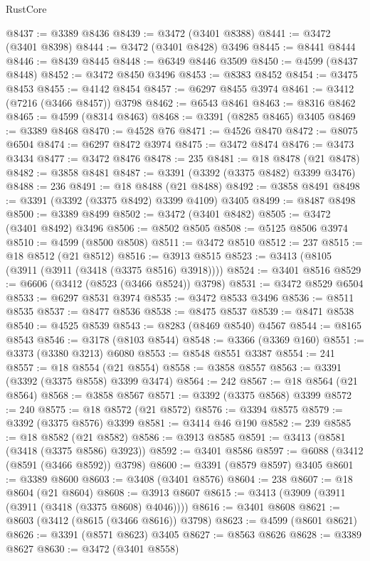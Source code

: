 \begin{lexlean}{RustCore}
\begin{coremodule}
@8437 := @3389 @8436
@8439 := @3472 (@3401 @8388)
@8441 := @3472 (@3401 @8398)
@8444 := @3472 (@3401 @8428) @3496
@8445 := @8441 @8444
@8446 := @8439 @8445
@8448 := @6349 @8446 @3509
@8450 := @4599 (@8437 @8448)
@8452 := @3472 @8450 @3496
@8453 := @8383 @8452
@8454 := @3475 @8453
@8455 := @4142 @8454
@8457 := @6297 @8455 @3974
@8461 := @3412 (@7216 (@3466 @8457)) @3798
@8462 := @6543 @8461
@8463 := @8316 @8462
@8465 := @4599 (@8314 @8463)
@8468 := @3391 (@8285 @8465) @3405
@8469 := @3389 @8468
@8470 := @4528 @76
@8471 := @4526 @8470
@8472 := @8075 @6504
@8474 := @6297 @8472 @3974
@8475 := @3472 @8474
@8476 := @3473 @3434
@8477 := @3472 @8476
@8478 := 235
@8481 := @18 @8478 (@21 @8478)
@8482 := @3858 @8481
@8487 := @3391 (@3392 (@3375 @8482) @3399 @3476)
@8488 := 236
@8491 := @18 @8488 (@21 @8488)
@8492 := @3858 @8491
@8498 := @3391 (@3392 (@3375 @8492) @3399 @4109) @3405
@8499 := @8487 @8498
@8500 := @3389 @8499
@8502 := @3472 (@3401 @8482)
@8505 := @3472 (@3401 @8492) @3496
@8506 := @8502 @8505
@8508 := @5125 @8506 @3974
@8510 := @4599 (@8500 @8508)
@8511 := @3472 @8510
@8512 := 237
@8515 := @18 @8512 (@21 @8512)
@8516 := @3913 @8515
@8523 := @3413 (@8105 (@3911 (@3911 (@3418 (@3375 @8516) @3918))))
@8524 := @3401 @8516
@8529 := @6606 (@3412 (@8523 (@3466 @8524)) @3798)
@8531 := @3472 @8529 @6504
@8533 := @6297 @8531 @3974
@8535 := @3472 @8533 @3496
@8536 := @8511 @8535
@8537 := @8477 @8536
@8538 := @8475 @8537
@8539 := @8471 @8538
@8540 := @4525 @8539
@8543 := @8283 (@8469 @8540) @4567
@8544 := @8165 @8543
@8546 := @3178 (@8103 @8544)
@8548 := @3366 (@3369 @160)
@8551 := @3373 (@3380 @3213) @6080
@8553 := @8548 @8551 @3387
@8554 := 241
@8557 := @18 @8554 (@21 @8554)
@8558 := @3858 @8557
@8563 := @3391 (@3392 (@3375 @8558) @3399 @3474)
@8564 := 242
@8567 := @18 @8564 (@21 @8564)
@8568 := @3858 @8567
@8571 := @3392 (@3375 @8568) @3399
@8572 := 240
@8575 := @18 @8572 (@21 @8572)
@8576 := @3394 @8575
@8579 := @3392 (@3375 @8576) @3399
@8581 := @3414 @46 @190
@8582 := 239
@8585 := @18 @8582 (@21 @8582)
@8586 := @3913 @8585
@8591 := @3413 (@8581 (@3418 (@3375 @8586) @3923))
@8592 := @3401 @8586
@8597 := @6088 (@3412 (@8591 (@3466 @8592)) @3798)
@8600 := @3391 (@8579 @8597) @3405
@8601 := @3389 @8600
@8603 := @3408 (@3401 @8576)
@8604 := 238
@8607 := @18 @8604 (@21 @8604)
@8608 := @3913 @8607
@8615 := @3413 (@3909 (@3911 (@3911 (@3418 (@3375 @8608) @4046))))
@8616 := @3401 @8608
@8621 := @8603 (@3412 (@8615 (@3466 @8616)) @3798)
@8623 := @4599 (@8601 @8621)
@8626 := @3391 (@8571 @8623) @3405
@8627 := @8563 @8626
@8628 := @3389 @8627
@8630 := @3472 (@3401 @8558)

\end{coremodule}
\end{lexlean}
